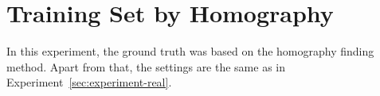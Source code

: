 \section{Training Set by Homography}
\label{sec:traininghomo}

In this experiment, the ground truth was based on the homography finding method. Apart from that, the settings are the same as in Experiment~\ref{sec:experiment-real}.